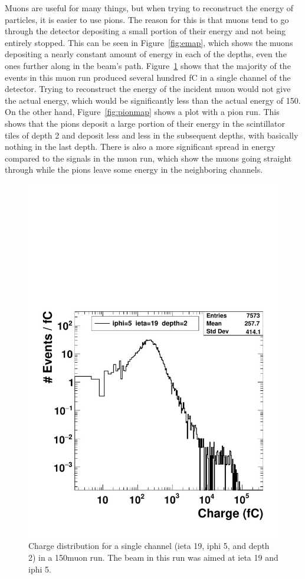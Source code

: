 Muons are useful for many things, but when trying to reconstruct the energy of particles, it is easier to use pions. The reason for this is that muons tend to go through the detector depositing a small portion of their energy and not being entirely stopped. This can be seen in Figure~\ref{fig:emap}, which shows the muons depositing a nearly constant amount of energy in each of the depths, even the ones further along in the beam's path. Figure~\ref{fig:Muon} shows that the majority of the events in this muon run produced several hundred fC in a single channel of the detector. Trying to reconstruct the energy of the incident muon would not give the actual energy, which would be significantly less than the actual energy of 150\GeV. On the other hand, Figure~\ref{fig:pionmap} shows a plot with a pion run. This shows that the pions deposit a large portion of their energy in the scintillator tiles of depth 2 and deposit less and less in the subsequent depths, with basically nothing in the last depth. There is also a more significant spread in energy compared to the signals in the muon run, which show the muons going straight through while the pions leave some energy in the neighboring channels.

\begin{figure}
\centering
\includegraphics[width=0.7\linewidth]{Figures/MuonCharge.pdf}
\caption{Charge distribution for a single channel (ieta 19, iphi 5, and depth 2) in a 150\GeV\space muon run. The beam in this run was aimed at ieta 19 and iphi 5.}
\label{fig:Muon}
\end{figure}

